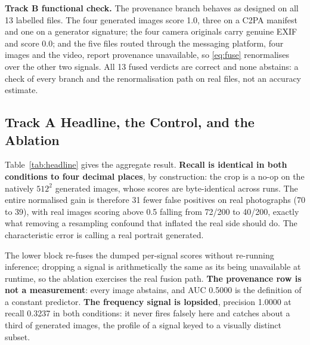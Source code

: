 \documentclass[conference]{IEEEtran}
\begin{document}
\textbf{Track B functional check.} The provenance branch behaves as designed on
all 13 labelled files. The four generated images score 1.0, three on a C2PA
manifest and one on a generator signature; the four camera originals carry
genuine EXIF and score 0.0; and the five files routed through the messaging
platform, four images and the video, report provenance unavailable, so
\eqref{eq:fuse} renormalises over the other two signals. All 13 fused verdicts
are correct and none abstains: a check of every branch and the
renormalisation path on real files, not an accuracy estimate.

\subsection{Track A Headline, the Control, and the Ablation}

Table~\ref{tab:headline} gives the aggregate result. \textbf{Recall is
identical in both conditions to four decimal places}, by construction: the crop
is a no-op on the natively $512^2$ generated images, whose scores are
byte-identical across runs. The entire normalised gain is therefore 31 fewer
false positives on real photographs (70 to 39), with real images scoring above
0.5 falling from 72/200 to 40/200, exactly what removing a resampling confound
that inflated the real side should do. The characteristic error is calling a
real portrait generated.

The lower block re-fuses the dumped per-signal scores without re-running
inference; dropping a signal is arithmetically the same as its being
unavailable at runtime, so the ablation exercises the real fusion path.
\textbf{The provenance row is not a measurement}: every image abstains, and AUC
0.5000 is the definition of a constant predictor. \textbf{The frequency signal
is lopsided}, precision 1.0000 at recall 0.3237 in both conditions: it never
fires falsely here and catches about a third of generated images, the profile
of a signal keyed to a visually distinct subset.
\end{document}
